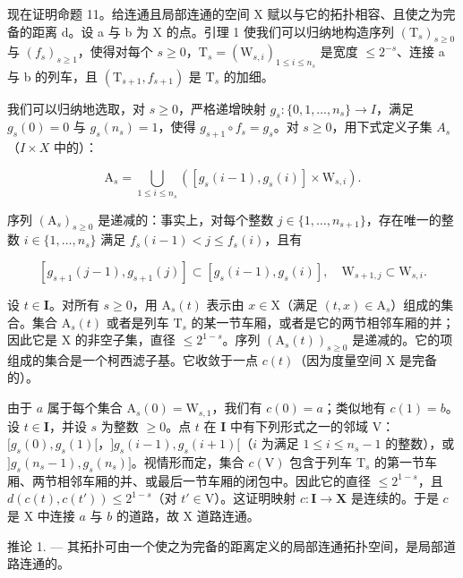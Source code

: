现在证明命题 11。给连通且局部连通的空间 X 赋以与它的拓扑相容、且使之为完备的距离 d。设 a 与 b 为 X 的点。引理 1 使我们可以归纳地构造序列 \((\mathrm{T}_s)_{s \geqslant 0}\) 与 \((f_s)_{s \geqslant 1}\)，使得对每个 \(s \geqslant 0\)，\(\mathrm{T}_s = (\mathrm{W}_{s,i})_{1 \leqslant i \leqslant n_s}\) 是宽度 \(\leqslant 2^{-s}\)、连接 a 与 b 的列车，且 \((\mathrm{T}_{s+1}, f_{s+1})\) 是 \(\mathrm{T}_s\) 的加细。

我们可以归纳地选取，对 \(s \geqslant 0\)，严格递增映射 \(g_{s} \colon \{0,1,\ldots,n_{s}\} \to I\)，满足 \(g_{s}(0) = 0\) 与 \(g_{s}(n_{s}) = 1\)，使得 \(g_{s+1} \circ f_{s} = g_{s}\)。对 \(s \geqslant 0\)，用下式定义子集 \(A_{s}\)（\(I \times X\) 中的）：

\[
\mathrm{A} _ {s} = \bigcup_ {1 \leqslant i \leqslant n _ {s}} ([ g _ {s} (i - 1), g _ {s} (i) ] \times \mathrm{W} _ {s, i}).
\]

序列 \((\mathrm{A}_{s})_{s\geqslant0}\) 是递减的：事实上，对每个整数 \(j\in\{1,\ldots,n_{s+1}\}\)，存在唯一的整数 \(i\in\{1,\ldots,n_{s}\}\) 满足 \(f_{s}(i-1)<j\leqslant f_{s}(i)\)，且有

\[
[ g _ {s + 1} (j - 1), g _ {s + 1} (j) ] \subset [ g _ {s} (i - 1), g _ {s} (i) ], \quad \mathrm{W} _ {s + 1, j} \subset \mathrm{W} _ {s, i}.
\]

设 \(t \in \mathbf{I}\)。对所有 \(s \geqslant 0\)，用 \(\mathrm{A}_s(t)\) 表示由 \(x \in \mathrm{X}\)（满足 \((t, x) \in \mathrm{A}_s\)）组成的集合。集合 \(\mathrm{A}_s(t)\) 或者是列车 \(\mathrm{T}_s\) 的某一节车厢，或者是它的两节相邻车厢的并；因此它是 \(\mathrm{X}\) 的非空子集，直径 \(\leqslant 2^{1-s}\)。序列 \((\mathrm{A}_s(t))_{s \geqslant 0}\) 是递减的。它的项组成的集合是一个柯西滤子基。它收敛于一点 \(c(t)\)（因为度量空间 \(\mathrm{X}\) 是完备的）。

由于 \(a\) 属于每个集合 \(\mathrm{A}_s(0) = \mathrm{W}_{s,1}\)，我们有 \(c(0) = a\)；类似地有 \(c(1) = b\)。设 \(t \in \mathbf{I}\)，并设 \(s\) 为整数 \(\geqslant 0\)。点 \(t\) 在 \(\mathbf{I}\) 中有下列形式之一的邻域 V：\([g_s(0), g_s(1)[\)，\(]g_s(i - 1), g_s(i + 1)[\)（\(i\) 为满足 \(1 \leqslant i \leqslant n_s - 1\) 的整数），或 \(]g_s(n_s - 1), g_s(n_s)]\)。视情形而定，集合 \(c(\mathrm{V})\) 包含于列车 \(\mathrm{T}_s\) 的第一节车厢、两节相邻车厢的并、或最后一节车厢的闭包中。因此它的直径 \(\leqslant 2^{1-s}\)，且 \(d(c(t), c(t')) \leqslant 2^{1-s}\)（对 \(t' \in \mathrm{V}\)）。这证明映射 \(c\colon \mathbf{I} \to \mathbf{X}\) 是连续的。于是 \(c\) 是 X 中连接 \(a\) 与 \(b\) 的道路，故 X 道路连通。

推论 1. --- 其拓扑可由一个使之为完备的距离定义的局部连通拓扑空间，是局部道路连通的。


